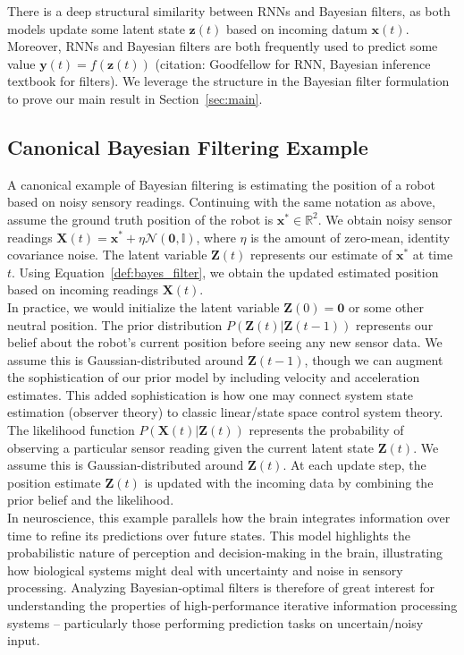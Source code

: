 \documentclass[12pt]{article}
\begin{document}
There is a deep structural similarity between RNNs and Bayesian filters, as
both models update some latent state $\mathbf z(t)$ based on incoming datum
$\mathbf x(t)$. 
Moreover, RNNs and Bayesian filters are both frequently used to predict some
value $\mathbf y(t) = f(\mathbf z(t))$ (citation: Goodfellow for RNN, Bayesian
inference textbook for filters).
We leverage the structure in the Bayesian filter formulation to prove our main
result in Section~\ref{sec:main}. 


\subsection{Canonical Bayesian Filtering Example}
A canonical example of Bayesian filtering is estimating the position of a robot based on noisy sensory readings. 
Continuing with the same notation as above, assume the ground truth position of the robot is $\mathbf x^* \in \mathbb R^2$. 
We obtain noisy sensor readings $\mathbf X(t) = \mathbf x^* + \eta \mathcal N(\mathbf 0, \mathbb I)$, where $\eta$ is the amount of zero-mean, identity covariance noise. 
The latent variable $\mathbf Z(t)$ represents our estimate of $\mathbf x^*$ at time $t$. 
Using Equation~\ref{def:bayes_filter}, we obtain the updated estimated position based on incoming readings $\mathbf X(t)$. \\

In practice, we would initialize the latent variable $\mathbf Z(0) = \mathbf 0$ or some other neutral position. 
The prior distribution $P(\mathbf Z(t) | \mathbf Z(t-1))$ represents our belief about the robot's current position before seeing any new sensor data. 
We assume this is Gaussian-distributed around $\mathbf Z(t-1)$, though we can augment the sophistication of our prior model by including velocity and acceleration estimates. 
This added sophistication is how one may connect system state estimation (observer theory) to classic linear/state space control system theory. 
The likelihood function $P(\mathbf X(t) | \mathbf Z(t))$ represents the probability of observing a particular sensor reading given the current latent state $\mathbf Z(t)$. 
We assume this is Gaussian-distributed around $\mathbf Z(t)$. 
At each update step, the position estimate $\mathbf Z(t)$ is updated with the incoming data by combining the prior belief and the likelihood. \\ 

In neuroscience, this example parallels how the brain integrates information over time to refine its predictions over future states. 
This model highlights the probabilistic nature of perception and decision-making in the brain, illustrating how biological systems might deal with uncertainty and noise in sensory processing.
Analyzing Bayesian-optimal filters is therefore of great interest for understanding the properties of high-performance iterative information processing systems -- particularly those performing prediction tasks on uncertain/noisy input.
\end{document}
